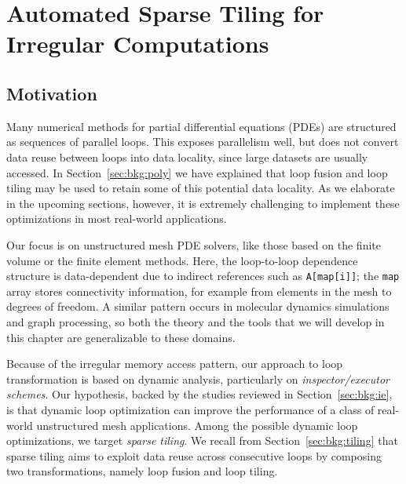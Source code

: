 \chapter{Automated Sparse Tiling for Irregular Computations}
\label{ch:sparsetiling}

\section{Motivation}
\label{sec:tiling:motivation}





Many numerical methods for partial differential equations (PDEs) are structured as sequences of parallel loops. This exposes parallelism well, but does not convert data reuse between loops into data locality, since large datasets are usually accessed. In Section~\ref{sec:bkg:poly} we have explained that loop fusion and loop tiling may be used to retain some of this potential data locality. As we elaborate in the upcoming sections, however, it is extremely challenging to implement these optimizations in most real-world applications. 

Our focus is on unstructured mesh PDE solvers, like those based on the finite volume or the finite element methods. Here, the  loop-to-loop dependence structure is data-dependent due to
indirect references such as \texttt{A[map[i]]}; the \texttt{map} array stores connectivity information, for example from elements in the mesh to degrees of freedom. A similar pattern occurs in molecular dynamics simulations and graph processing, so both the theory and the tools that we will develop in this chapter are generalizable to these domains. 

Because of the irregular memory access pattern, our approach to loop transformation is based on dynamic analysis, particularly on \textit{inspector/executor schemes}. Our hypothesis, backed by the studies reviewed in Section~\ref{sec:bkg:ie}, is that dynamic loop optimization can improve the performance of a class of real-world unstructured mesh applications. Among the possible dynamic loop optimizations, we target \textit{sparse tiling}. We recall from Section~\ref{sec:bkg:tiling} that sparse tiling aims to exploit data reuse across consecutive loops by composing two transformations, namely loop fusion and loop tiling. 

